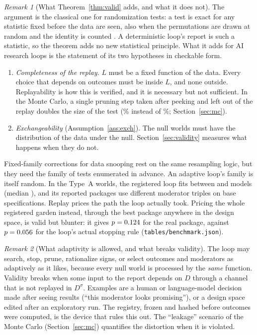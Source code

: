 \documentclass[11pt]{article}
\theoremstyle{remark}\newtheorem{remark}{Remark}
\begin{document}
\begin{remark}[What Theorem~\ref{thm:valid} adds, and what it does not]\label{rem:adds}
The argument is the classical one for randomization tests: a test is exact for any statistic fixed before the data are
seen, also when the permutations are drawn at random and the identity is counted
\citep{lehmann2022testing,hemerik2018exact}. A deterministic loop's report is such a statistic, so the theorem adds no new
statistical principle. What it adds for AI research loops is the statement of its two hypotheses in checkable form.
\begin{enumerate}
\item \emph{Completeness of the replay.} $L$ must be a fixed function of the data. Every choice that depends on outcomes
must be inside $L$, and none outside. Replayability is how this is verified, and it is necessary but not sufficient. In the
Monte Carlo, a single pruning step taken after peeking and left out of the replay doubles the size of the test
(\MCsizeLeak\% instead of \MCsizeLeakReplay\%; Section~\ref{sec:mc}).
\item \emph{Exchangeability} (Assumption~\ref{ass:exch}). The null worlds must have the distribution of the data under the
null. Section~\ref{sec:validity} measures what happens when they do not.
\end{enumerate}
Fixed-family corrections for data snooping \citep{white2000reality,romano2005stepwise,hansen2005test} rest on the same
resampling logic, but they need the family of tests enumerated in advance. An adaptive loop's family is itself random. In the
\Bnull Type~A worlds, the registered loop fits between \VModelsMin and \VModelsMax models (median \VModelsMed), and its
reported packages use \VTriples different moderator triples on \VBaseDistinct base specifications. Replay prices the path the
loop actually took. Pricing the whole registered garden instead, through the best package anywhere in the design space, is
valid but blunter: it gives $p=0.124$ for the real package, against $p=0.056$ for the loop's actual stopping rule
(\texttt{tables/benchmark.json}).
\end{remark}

\begin{remark}[What adaptivity is allowed, and what breaks validity]
The loop may search, stop, prune, rationalize signs, or select outcomes and moderators as adaptively as it likes, because
every null world is processed by the \emph{same} function. Validity breaks when some input to the report depends on $D$
through a channel that is not replayed in $D^{\sigma}$. Examples are a human or language-model decision made after seeing
results (``this moderator looks promising''), or a design space edited after an exploratory run. The registry, frozen and
hashed before outcomes were computed, is the device that rules this out. The ``leakage'' scenario of the Monte Carlo
(Section~\ref{sec:mc}) quantifies the distortion when it is violated.
\end{remark}
\end{document}
